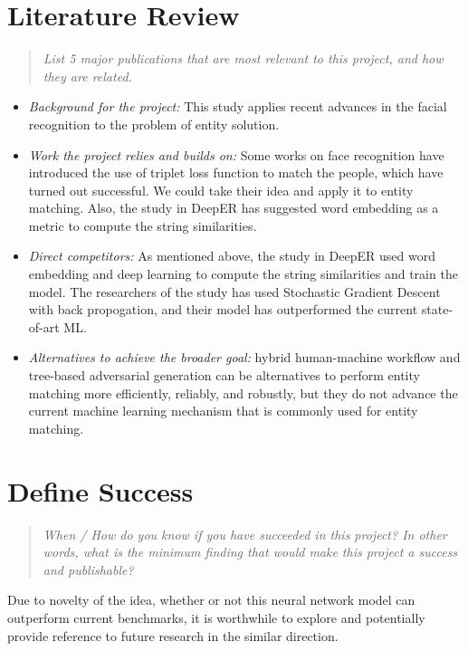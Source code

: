 \documentclass{proc}
\begin{document}
\section{Literature Review}
\begin{quote}
\emph{List 5 major publications that are most relevant to this project, and how they are related.}
\end{quote}

\begin{itemize}
\item \emph{Background for the project:} This study applies recent advances in the facial recognition to the problem of entity solution.

\item \emph{Work the project relies and builds on: } Some works on face recognition have introduced the use of triplet loss function to match the people, which have turned out  successful. We could take their idea and apply it to entity matching. Also, the study in DeepER has suggested word embedding as a metric to compute the string similarities.

\item \emph{Direct competitors: } As mentioned above, the study in DeepER used word embedding and deep learning to compute the string similarities and train the model. The researchers of the study has used Stochastic Gradient Descent with back propogation, and their model has outperformed the current state-of-art ML.

\item \emph{Alternatives to achieve the broader goal: } hybrid human-machine workflow and tree-based adversarial generation can be alternatives to perform entity matching more efficiently, reliably, and robustly, but they do not advance the current machine learning mechanism that is commonly used for entity matching.

 \end{itemize}


\section{Define Success}
\begin{quote}
\emph{When / How do you know if you have succeeded in this project?
In other words, what is the minimum finding that would make this project a success and publishable?}
\end{quote}

Due to novelty of the idea, whether or not this neural network model can outperform current benchmarks, it is worthwhile to explore and potentially provide reference to future research in the similar direction.



\end{document}
